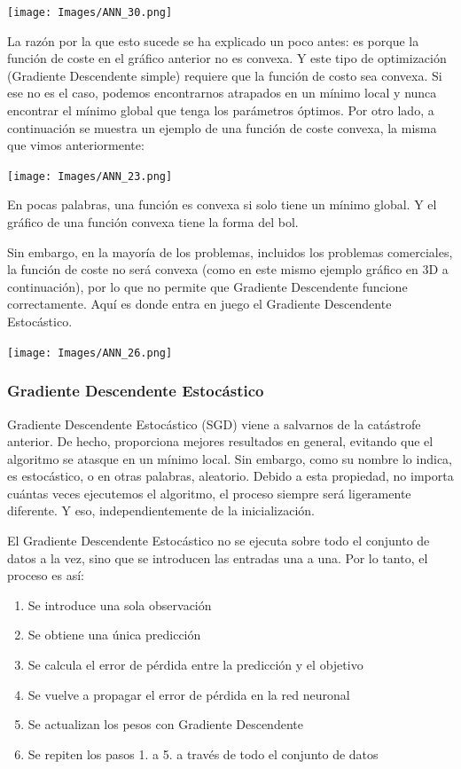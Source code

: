 \documentclass[
]{book}
\providecommand{\tightlist}{%
  \setlength{\itemsep}{0pt}\setlength{\parskip}{0pt}}
\begin{document}
\texttt{[image: Images/ANN\_30.png]}

La razón por la que esto sucede se ha explicado un poco antes: es porque la función de coste en el gráfico anterior no es convexa. Y este tipo de optimización (Gradiente Descendente simple) requiere que la función de costo sea convexa. Si ese no es el caso, podemos encontrarnos atrapados en un mínimo local y nunca encontrar el mínimo global que tenga los parámetros óptimos. Por otro lado, a continuación se muestra un ejemplo de una función de coste convexa, la misma que vimos anteriormente:

\texttt{[image: Images/ANN\_23.png]}

En pocas palabras, una función es convexa si solo tiene un mínimo global. Y el gráfico de una función convexa tiene la forma del bol.

Sin embargo, en la mayoría de los problemas, incluidos los problemas comerciales, la función de coste no será convexa (como en este mismo ejemplo gráfico en 3D a continuación), por lo que no permite que Gradiente Descendente funcione correctamente. Aquí es donde entra en juego el Gradiente Descendente Estocástico.

\texttt{[image: Images/ANN\_26.png]}

\hypertarget{gradiente-descendente-estocuxe1stico}{%
\subsubsection{Gradiente Descendente Estocástico}\label{gradiente-descendente-estocuxe1stico}}

Gradiente Descendente Estocástico (SGD) viene a salvarnos de la catástrofe anterior. De hecho, proporciona mejores resultados en general, evitando que el algoritmo se atasque en un mínimo local. Sin embargo, como su nombre lo indica, es estocástico, o en otras palabras, aleatorio. Debido a esta propiedad, no importa cuántas veces ejecutemos el algoritmo, el proceso siempre será ligeramente diferente. Y eso, independientemente de la inicialización.

El Gradiente Descendente Estocástico no se ejecuta sobre todo el conjunto de datos a la vez, sino que se introducen las entradas una a una. Por lo tanto, el proceso es así:

\begin{enumerate}
\def\labelenumi{\arabic{enumi}.}
\tightlist
\item
  Se introduce una sola observación
\item
  Se obtiene una única predicción
\item
  Se calcula el error de pérdida entre la predicción y el objetivo
\item
  Se vuelve a propagar el error de pérdida en la red neuronal
\item
  Se actualizan los pesos con Gradiente Descendente
\item
  Se repiten los pasos 1. a 5. a través de todo el conjunto de datos
\end{enumerate}
\end{document}
